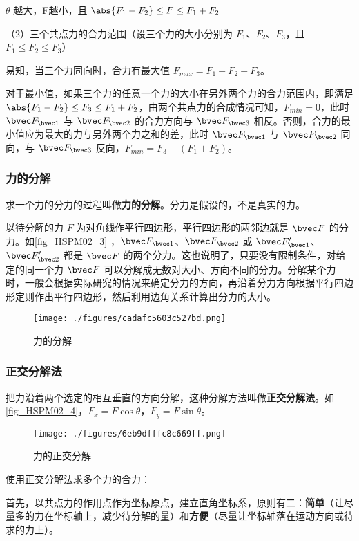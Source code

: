 $\theta$ 越大，F越小，且 $\abs{F_1-F_2}\leq F\leq F_1+F_2$

（2）三个共点力的合力范围（设三个力的大小分别为 $F_1$、$F_2$、$F_3$，且 $F_1\leq F_2 \leq F_3$）

易知，当三个力同向时，合力有最大值 $F_{max}=F_1+F_2+F_3$。

对于最小值，如果三个力的任意一个力的大小在另外两个力的合力范围内，即满足 $\abs{F_1-F_2}\leq F_3\leq F_1+F_2$，由两个共点力的合成情况可知，$F_{min}=0$，此时 $\bvec F_{\bvec 1}$ 与 $\bvec F_{\bvec 2}$ 的合力方向与 $\bvec F_{\bvec 3}$ 相反。否则，合力的最小值应为最大的力与另外两个力之和的差，此时 $\bvec F_{\bvec 1}$ 与 $\bvec F_{\bvec 2}$ 同向，与 $\bvec F_{\bvec 3}$ 反向，$F_{min}=F_3-(F_1+F_2)$。

\subsubsection{力的分解}
求一个力的分力的过程叫做\textbf{力的分解}。分力是假设的，不是真实的力。

以待分解的力 $F$ 为对角线作平行四边形，平行四边形的两邻边就是 $\bvec F$ 的分力。如\autoref{fig_HSPM02_3} ，$\bvec F_{\bvec 1}$、$\bvec F_{\bvec 2}$ 或 $\bvec F_{\bvec 1}'$、$\bvec F_{\bvec 2}'$ 都是 $\bvec F$ 的两个分力。这也说明了，只要没有限制条件，对给定的同一个力 $\bvec F$ 可以分解成无数对大小、方向不同的分力。分解某个力时，一般会根据实际研究的情况来确定分力的方向，再沿着分力方向根据平行四边形定则作出平行四边形，然后利用边角关系计算出分力的大小。
\begin{figure}[ht]
\centering
\texttt{[image: ./figures/cadafc5603c527bd.png]}
\caption{力的分解} \label{fig_HSPM02_3}
\end{figure}

\subsubsection{正交分解法}
把力沿着两个选定的相互垂直的方向分解，这种分解方法叫做\textbf{正交分解法}。如\autoref{fig_HSPM02_4}，$F_{x}=F\cos\theta$，$F_{y}=F\sin\theta$。
\begin{figure}[ht]
\centering
\texttt{[image: ./figures/6eb9dfffc8c669ff.png]}
\caption{力的正交分解} \label{fig_HSPM02_4}
\end{figure}

使用正交分解法求多个力的合力：

首先，以共点力的作用点作为坐标原点，建立直角坐标系，原则有二：\textbf{简单}（让尽量多的力在坐标轴上，减少待分解的量）和\textbf{方便}（尽量让坐标轴落在运动方向或待求的力上）。

